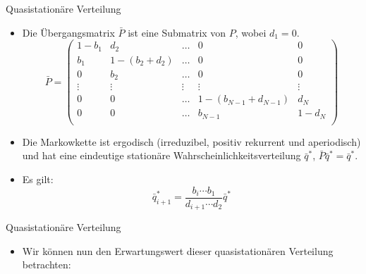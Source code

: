 \documentclass{beamer}
\begin{document}
\begin{frame}{Quasistationäre Verteilung}
  \begin{itemize}
    \item Die Übergangsmatrix $\bar{P}$ ist eine Submatrix von $P$, wobei $d_1 = 0$.
      \[
      \bar{P} = \begin{pmatrix}
        1-b_1 & d_2 & \dots & 0 & 0 \\
        b_1 & 1 - (b_2 + d_2) &  \dots & 0 & 0 \\
        0 & b_2 & \dots & 0 & 0 \\
        \vdots & \vdots & \vdots & \vdots & \vdots \\
        0 & 0  &  \dots & 1 - (b_{N-1} + d_{N-1}) & d_N \\
        0 & 0  &  \dots & b_{N-1} & 1 - d_N \\
      \end{pmatrix}
    \]
  \item Die Markowkette ist ergodisch (irreduzibel, positiv rekurrent und aperiodisch) und hat eine eindeutige stationäre Wahrscheinlichkeitsverteilung $\bar{q}^*$, $\bar{P}\bar{q}^* = \bar{q}^*$.
  \item Es gilt:
    \[
      \bar{q}^*_{i+1} = \frac{b_i \cdots b_1}{d_{i+1}\cdots d_2}\bar{q}^*
    \]
  \end{itemize}
\end{frame}
\begin{frame}{Quasistationäre Verteilung}
  \begin{itemize}
  \item Wir können nun den Erwartungswert dieser quasistationären Verteilung betrachten:
  \end{itemize}
\end{frame}
\end{document}

